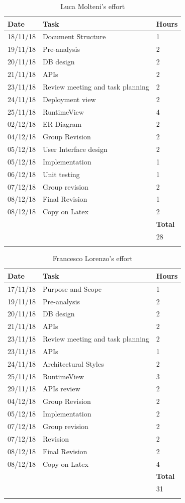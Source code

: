 \documentclass[titlepage]{article}
\begin{document}
		\begin{longtable}{| p{2 cm} | p{5 cm} | p{2 cm} |} 
		\hline
		{\bf Date} & {\bf Task} & {\bf Hours}\\
		\hline
		18/11/18 & Document Structure & 1 \\
		19/11/18 & Pre-analysis & 2 \\
		20/11/18 & DB design & 2 \\
		21/11/18 & APIs & 2 \\
		23/11/18 & Review meeting and task planning & 2 \\
		24/11/18 & Deployment view & 2 \\
		25/11/18 & RuntimeView & 4 \\
		02/12/18 & ER Diagram & 2 \\
		04/12/18 & Group Revision & 2\\
		05/12/18 & User Interface design & 2\\
		05/12/18 & Implementation & 1\\
		06/12/18 & Unit testing & 1\\
		07/12/18 & Group revision & 2 \\
		08/12/18 & Final Revision & 1 \\
		08/12/18 & Copy on Latex & 2 \\
		\hline
		& & {\bf Total} \\
		\hline
		& & 28 \\
		\hline
		\caption{Luca Molteni's effort}
	\end{longtable}
	
	\begin{longtable}{| p{2 cm} | p{5 cm} | p{2 cm} |} 
		\hline
		{\bf Date} & {\bf Task} & {\bf Hours}\\
		\hline
		17/11/18 & Purpose and Scope & 1 \\
		19/11/18 & Pre-analysis & 2 \\
		20/11/18 & DB design & 2 \\
		21/11/18 & APIs & 2 \\
		23/11/18 & Review meeting and task planning & 2 \\
		23/11/18 & APIs & 1 \\
		24/11/18 & Architectural Styles & 2 \\
		25/11/18 & RuntimeView & 3 \\
		29/11/18 & APIs review & 2 \\
		04/12/18 & Group Revision & 2 \\
		05/12/18 & Implementation & 2 \\
		07/12/18 & Group revision & 2 \\
		07/12/18 & Revision & 2 \\
		08/12/18 & Final Revision & 2 \\
		08/12/18 & Copy on Latex & 4 \\
		\hline
		& & {\bf Total} \\
		\hline
		& & 31 \\
		\hline
		\caption{Francesco Lorenzo's effort}
	\end{longtable}


\pagebreak

\end{document}
